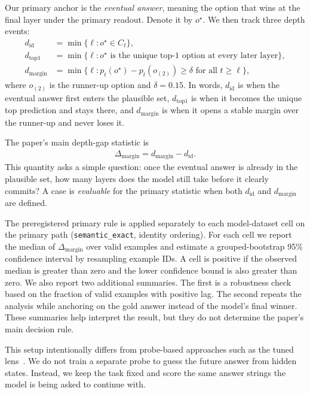 Our primary anchor is the \emph{eventual answer}, meaning the option that wins at the final layer under the primary readout. Denote it by $o^\star$. We then track three depth events:
\begin{align}
d_{\mathrm{id}} &= \min \{\ell : o^\star \in C_\ell\}, \\
d_{\mathrm{top1}} &= \min \{\ell : o^\star \text{ is the unique top-1 option at every later layer}\}, \\
d_{\mathrm{margin}} &= \min \{\ell : p_t(o^\star) - p_t(o_{(2)}) \ge \delta \text{ for all } t \ge \ell\},
\end{align}
where $o_{(2)}$ is the runner-up option and $\delta = 0.15$. In words, $d_{\mathrm{id}}$ is when the eventual answer first enters the plausible set, $d_{\mathrm{top1}}$ is when it becomes the unique top prediction and stays there, and $d_{\mathrm{margin}}$ is when it opens a stable margin over the runner-up and never loses it.

The paper's main depth-gap statistic is
\begin{align}
\Delta_{\mathrm{margin}} = d_{\mathrm{margin}} - d_{\mathrm{id}}.
\end{align}
This quantity asks a simple question: once the eventual answer is already in the plausible set, how many layers does the model still take before it clearly commits? A case is \emph{evaluable} for the primary statistic when both $d_{\mathrm{id}}$ and $d_{\mathrm{margin}}$ are defined.

The preregistered primary rule is applied separately to each model-dataset cell on the primary path (\texttt{semantic\_exact}, identity ordering). For each cell we report the median of $\Delta_{\mathrm{margin}}$ over valid examples and estimate a grouped-bootstrap 95\% confidence interval by resampling example IDs. A cell is positive if the observed median is greater than zero and the lower confidence bound is also greater than zero. We also report two additional summaries. The first is a robustness check based on the fraction of valid examples with positive lag. The second repeats the analysis while anchoring on the gold answer instead of the model's final winner. These summaries help interpret the result, but they do not determine the paper's main decision rule.

This setup intentionally differs from probe-based approaches such as the tuned lens~\citep{belrose2023tuned}. We do not train a separate probe to guess the future answer from hidden states. Instead, we keep the task fixed and score the same answer strings the model is being asked to continue with.
